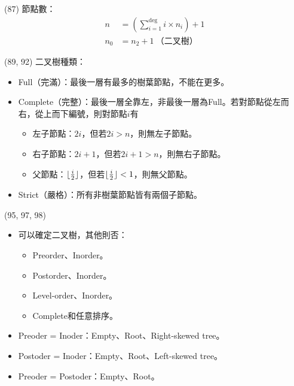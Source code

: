 \item \begin{theorem}{(87)} 節點數：\begin{equation}
        \begin{aligned}
            n & = (\sum_{i = 1}^{\deg}i \times n_i) + 1 \\
            n_0 & = n_2 + 1 \ \text{（二叉樹）}
        \end{aligned}
    \end{equation}
\end{theorem}

\item \begin{theorem}{(89, 92)} 二叉樹種類：\begin{itemize}
        \item Full（完滿）：最後一層有最多的樹葉節點，不能在更多。
        \item Complete（完整）：最後一層全靠左，非最後一層為Full。若對節點從左而右，從上而下編號，則對節點$i$有\begin{itemize}
            \item 左子節點：$2i$，但若$2i > n$，則無左子節點。
            \item 右子節點：$2i + 1$，但若$2i + 1 > n$，則無右子節點。
            \item 父節點：$\lfloor\frac{i}{2}\rfloor$，但若$\lfloor\frac{i}{2}\rfloor < 1$，則無父節點。
        \end{itemize}
        \item Strict（嚴格）：所有非樹葉節點皆有兩個子節點。
    \end{itemize}
\end{theorem}

\item \begin{theorem}{(95, 97, 98)} \quad\quad \begin{itemize}
        \item 可以確定二叉樹，其他則否：\begin{itemize}
            \item Preorder、Inorder。
            \item Postorder、Inorder。
            \item Level-order、Inorder。
            \item Complete和任意排序。
        \end{itemize}
        \item Preoder = Inoder：Empty、Root、Right-skewed tree。
        \item Postoder = Inoder：Empty、Root、Left-skewed tree。
        \item Preoder = Postoder：Empty、Root。
    \end{itemize}
\end{theorem}

